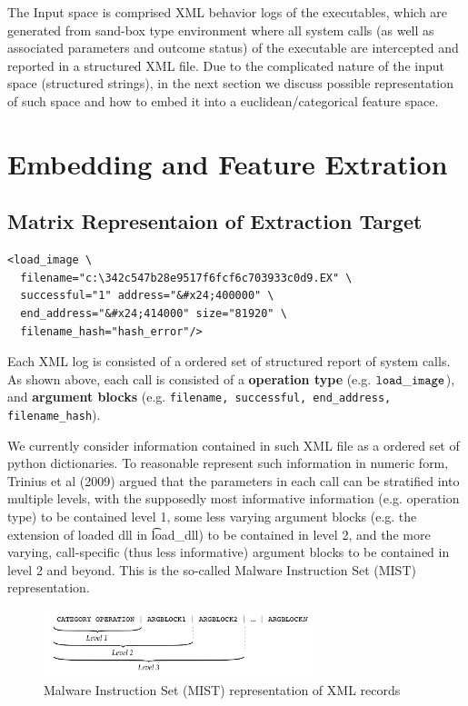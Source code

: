 \documentclass[11pt]{article}
\theoremstyle{definition}
\begin{document}
The Input space is comprised XML behavior logs of the executables, which are generated from sand-box type environment where all system calls (as well as  associated parameters and outcome status) of the executable are intercepted and reported in a structured XML file.  Due to the complicated nature of the input space (structured strings), in the next section we discuss possible representation of such space and how to embed it into a euclidean/categorical feature space.

\newpage
\section{\textbf{Embedding and Feature Extration}}

\subsection{\textbf{Matrix Representaion of Extraction Target}}

\begin{lstlisting}
<load_image \
  filename="c:\342c547b28e9517f6fcf6c703933c0d9.EX" \
  successful="1" address="&#x24;400000" \
  end_address="&#x24;414000" size="81920" \
  filename_hash="hash_error"/>
\end{lstlisting}

Each XML log is consisted of a ordered set of structured report of system calls. As shown above, each call is consisted of a \textbf{operation type} (e.g. ${\tt load\_image}$), and \textbf{argument blocks} (e.g. {\tt filename, successful, end\_address, filename\_hash}). 

We currently consider information contained in such XML file as a ordered set of python dictionaries. To reasonable represent such information in numeric form, Trinius et al (2009) argued that the parameters in each call can be stratified into multiple levels, with the supposedly most informative information (e.g. operation type) to be contained level 1, some less varying  argument blocks (e.g. the extension of loaded dll in {\t load\_dll}) to be contained in level 2, and the more varying, call-specific  (thus less informative) argument blocks to be contained in level 2 and beyond. This is the so-called Malware Instruction Set (MIST) representation.

\begin{figure}[!h]
    \centering
    \includegraphics[width=0.7\textwidth]{"./plots/MIST"}
    \caption{Malware Instruction Set (MIST) representation of XML records}
    \label{fig:awesome_image}
\end{figure}
\end{document}
